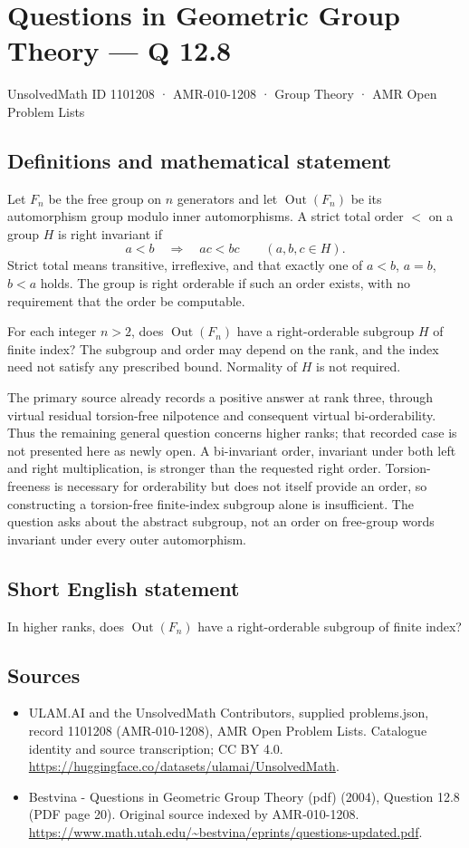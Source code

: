 \documentclass[11pt,a4paper]{article}
\begin{document}
\section*{Questions in Geometric Group Theory — Q 12.8}\label{1101208}
{\small UnsolvedMath ID 1101208 · AMR-010-1208 · Group Theory · AMR Open Problem Lists}
\subsection{Definitions and mathematical statement}
Let $F_n$ be the free group on $n$ generators and let $\operatorname{Out}(F_n)$ be its automorphism group modulo inner automorphisms. A strict total order $<$ on a group $H$ is right invariant if
\[
 a<b\quad\Longrightarrow\quad ac<bc
       \qquad(a,b,c\in H).
\]
Strict total means transitive, irreflexive, and that exactly one of $a<b$, $a=b$, $b<a$ holds. The group is right orderable if such an order exists, with no requirement that the order be computable.

For each integer $n>2$, does $\operatorname{Out}(F_n)$ have a right-orderable subgroup $H$ of finite index? The subgroup and order may depend on the rank, and the index need not satisfy any prescribed bound. Normality of $H$ is not required.

The primary source already records a positive answer at rank three, through virtual residual torsion-free nilpotence and consequent virtual bi-orderability. Thus the remaining general question concerns higher ranks; that recorded case is not presented here as newly open. A bi-invariant order, invariant under both left and right multiplication, is stronger than the requested right order. Torsion-freeness is necessary for orderability but does not itself provide an order, so constructing a torsion-free finite-index subgroup alone is insufficient. The question asks about the abstract subgroup, not an order on free-group words invariant under every outer automorphism.
\subsection{Short English statement}
In higher ranks, does $\operatorname{Out}(F_n)$ have a right-orderable subgroup of finite index?
\subsection{Sources}
\begin{itemize}
\item[S1] ULAM.AI and the UnsolvedMath Contributors, supplied problems.json, record 1101208 (AMR-010-1208), AMR Open Problem Lists. Catalogue identity and source transcription; CC BY 4.0.
\url{https://huggingface.co/datasets/ulamai/UnsolvedMath}.
\item[S2] Bestvina - Questions in Geometric Group Theory (pdf) (2004), Question 12.8 (PDF page 20). Original source indexed by AMR-010-1208.
\url{https://www.math.utah.edu/~bestvina/eprints/questions-updated.pdf}.
\end{itemize}
\end{document}
